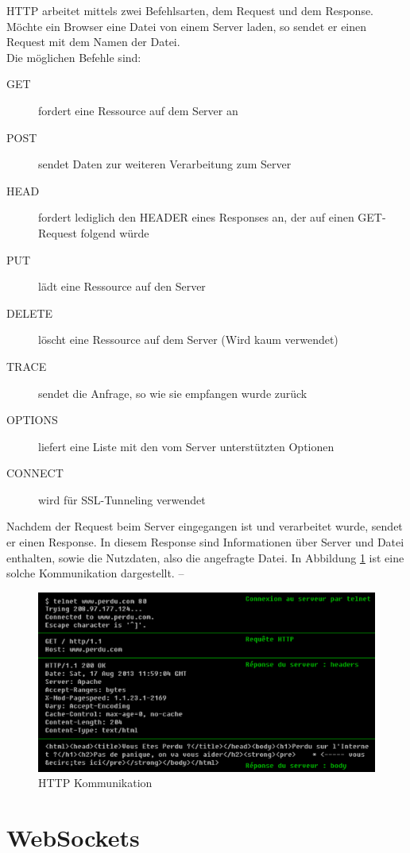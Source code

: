 HTTP arbeitet mittels zwei Befehlsarten, dem Request und dem Response. Möchte ein Browser eine Datei von einem Server laden, so sendet er einen Request mit dem Namen der Datei. \\
Die möglichen Befehle sind: 
\begin{description}
	\item[GET] fordert eine Ressource auf dem Server an
	\item[POST] sendet Daten zur weiteren Verarbeitung zum Server
	\item[HEAD] fordert lediglich den HEADER eines Responses an, der auf einen GET-Request folgend würde
	\item[PUT] lädt eine Ressource auf den Server
	\item[DELETE] löscht eine Ressource auf dem Server (Wird kaum verwendet)
	\item[TRACE] sendet die Anfrage, so wie sie empfangen wurde zurück
	\item[OPTIONS] liefert eine Liste mit den vom Server unterstützten Optionen
	\item[CONNECT] wird für SSL-Tunneling verwendet
\end{description} Nachdem der Request beim Server eingegangen ist und verarbeitet wurde, sendet er einen Response. In diesem Response sind Informationen über Server und Datei enthalten, sowie die Nutzdaten, also die angefragte Datei. In Abbildung \ref{fig:http_request_response} ist eine solche Kommunikation dargestellt.
-- 
\begin{figure}
	\includegraphics[width=\textwidth]{images/HTTP_request_response.pdf}
	\caption{HTTP Kommunikation}
	\label{fig:http_request_response}
\end{figure}



\section{WebSockets}

